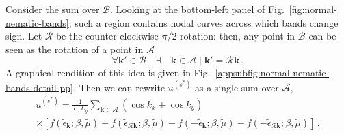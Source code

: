 \begin{tabproof}
\begin{enumerate}
	Consider the sum over $\mathcal{B}$. Looking at the bottom-left panel of Fig.~\ref{fig:normal-nematic-bands}, such a region contains nodal curves across which bands change sign.	
	Let $\mathcal{R}$ be the counter-clockwise $\pi/2$ rotation: then, any point in $\mathcal{B}$ can be seen as the rotation of a point in $\mathcal{A}$
	\begin{equation}\label{appeq:normal-B=RA}
		\forall \mathbf{k}' \in \mathcal{B} 
		\quad\exists\quad \mathbf{k} \in \mathcal{A} \mid \mathbf{k}' = \mathcal{R} \mathbf{k} \, .
	\end{equation}
	A graphical rendition of this idea is given in Fig.~\ref{appsubfig:normal-nematic-bands-detail-pp}. Then we can rewrite $u^{(s^*)}$ as a single sum over $\mathcal{A}$,
	\begin{multline}
		u^{(s^*)} = \frac{1}{L_x L_y} \sum_{\mathbf{k}\in\mathcal{A}} (\cos k_x + \cos k_y) \\
		\times \left[
		f(\tilde{\epsilon}_\mathbf{k};\beta,\tilde{\mu}) + f(\tilde{\epsilon}_{\mathcal{R}\mathbf{k}};\beta,\tilde{\mu}) - f(-\tilde{\epsilon}_\mathbf{k};\beta,\tilde{\mu}) - f(-\tilde{\epsilon}_{\mathcal{R}\mathbf{k}};\beta,\tilde{\mu})
		\right] \, .
		\label{appeq:normal-us*-AR}
	\end{multline}
	

\end{enumerate}
\end{tabproof}
